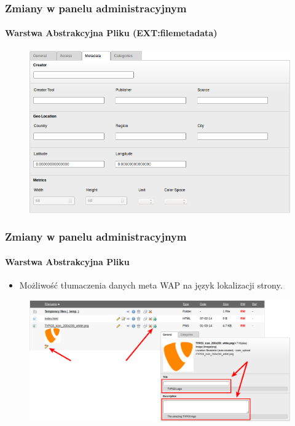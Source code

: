 
\begin{frame}[fragile]
	\frametitle{Zmiany w panelu administracyjnym}
	\framesubtitle{Warstwa Abstrakcyjna Pliku (EXT:filemetadata)}

	\begin{figure}
		\includegraphics[width=0.8\linewidth]{Images/BackendChanges/FileMetaData.png}
	\end{figure}

\end{frame}


\begin{frame}[fragile]
	\frametitle{Zmiany w panelu administracyjnym}
	\framesubtitle{Warstwa Abstrakcyjna Pliku}

	\begin{itemize}
		\item Możliwość tłumaczenia danych meta WAP na język lokalizacji strony.
	\end{itemize}

	\begin{figure}
		\includegraphics[width=0.95\linewidth]{Images/BackendChanges/FalTranslateMetaData.png}
	\end{figure}

\end{frame}

